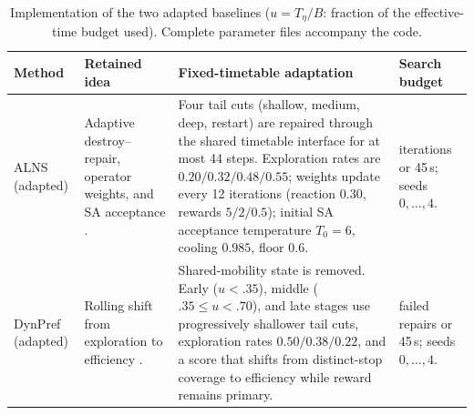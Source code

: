 \begin{table}[t]
    \centering
    \caption{Implementation of the two adapted baselines
    (\(u=T_\eta/B\): fraction of the effective-time budget used). Complete
    parameter files accompany the code.}
    \label{tab:adapted_baselines}
    \begingroup
    \scriptsize
    \setlength{\tabcolsep}{3pt}
    \renewcommand{\arraystretch}{1.05}
    \begin{tabular}{@{}>{\raggedright\arraybackslash}p{}
                    >{\raggedright\arraybackslash}p{}
                    >{\raggedright\arraybackslash}p{}
                    >{\raggedright\arraybackslash}p{}@{}}
        \toprule
        Method & Retained idea & Fixed-timetable adaptation & Search budget \\
        \midrule
        ALNS (adapted) &
        Adaptive destroy--repair, operator weights, and SA acceptance
        \cite{zhou2025optimalroutingdas}. &
        Four tail cuts (shallow, medium, deep, restart) are repaired through the
        shared timetable interface for at most 44 steps. Exploration rates are
        \(0.20/0.32/0.48/0.55\); weights update every 12 iterations
        (reaction \(0.30\), rewards \(5/2/0.5\)); initial SA acceptance
        temperature \(T_0=6\), cooling \(0.985\),
        floor \(0.6\). &
        160 iterations or 45\,s; seeds \(0,\ldots,4\). \\
        \addlinespace
        DynPref (adapted) &
        Rolling shift from exploration to efficiency
        \cite{zhang2025dynamicmultimodal}. &
        Shared-mobility state is removed. Early (\(u<.35\)), middle
        (\(.35\leq u<.70\)), and late stages use progressively shallower tail
        cuts, exploration rates \(0.50/0.38/0.22\), and a score that shifts from
        distinct-stop coverage to efficiency while reward remains primary. &
        24 failed repairs or 45\,s; seeds \(0,\ldots,4\). \\
        \bottomrule
    \end{tabular}
    \endgroup
\end{table}

